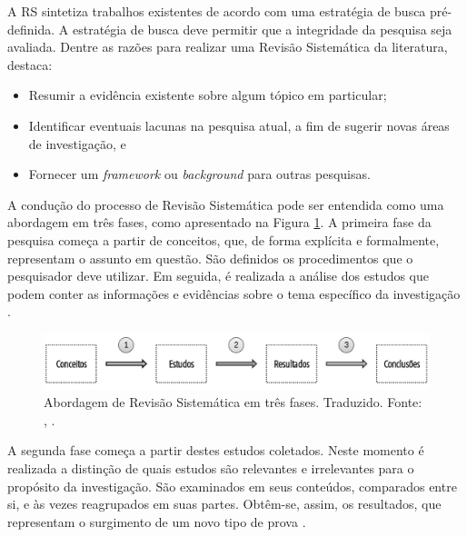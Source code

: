 A RS sintetiza trabalhos existentes de acordo com uma estratégia de busca pré-definida. A estratégia de busca deve permitir que a integridade da pesquisa seja avaliada. Dentre as razões para realizar uma Revisão Sistemática da literatura,  destaca:

\begin{itemize}
    \item Resumir a evidência existente sobre algum tópico em particular;
    \item Identificar eventuais lacunas na pesquisa atual, a fim de sugerir novas áreas de investigação, e
    \item Fornecer um \textit{framework} ou \textit{background} para outras pesquisas.
\end{itemize}



A condução do processo de Revisão Sistemática pode ser entendida como uma abordagem em três fases, como apresentado na Figura \ref{fig:fases_rs}. A primeira fase da pesquisa começa a partir de conceitos, que, de forma explícita e formalmente, representam o assunto em questão. São definidos os procedimentos que o pesquisador deve utilizar. Em seguida, é realizada a análise dos estudos que podem conter as informações e evidências sobre o tema específico da investigação \cite{biolchini2005}. 


\begin{figure}[!htb]
    \centering
    \includegraphics[scale=0.4]{figuras/fases_rs.png}  
    \caption{Abordagem de Revisão Sistemática em três fases. Traduzido. Fonte: \citeauthor{biolchini2005}, \citeyear{biolchini2005}.}
    \label{fig:fases_rs}
\end{figure}



A segunda fase começa a partir destes estudos coletados. Neste momento é realizada a distinção de quais estudos são relevantes e irrelevantes para o propósito da investigação. São examinados em seus conteúdos, comparados entre si, e às vezes reagrupados em suas partes. Obtêm-se, assim, os resultados, que representam o surgimento de um novo tipo de prova \cite{biolchini2005}. 

